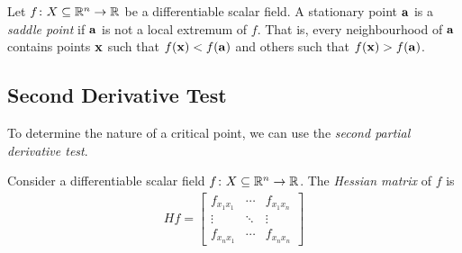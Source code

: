 \documentclass{article}
\begin{document}
\begin{definition}
  Let $f \colon X \subseteq \mathbb{R}^n \to \mathbb{R}$ be a differentiable scalar field.
  A stationary point $\mathbf{a}$ is a \emph{saddle point} if $\mathbf{a}$ is not a local extremum of $f$.
  That is, every neighbourhood of $\mathbf{a}$ contains points $\mathbf{x}$ such that $f(\mathbf{x}) < f(\mathbf{a})$ and others such that $f(\mathbf{x}) > f(\mathbf{a})$.
\end{definition}

\subsection{Second Derivative Test}

To determine the nature of a critical point, we can use the \emph{second partial derivative test}.

\begin{definition}
  Consider a differentiable scalar field $f \colon X \subseteq \mathbb{R}^n \to \mathbb{R}$.
  The \emph{Hessian matrix} of $f$ is
  \begin{align}
    Hf = \begin{bmatrix}
           f_{x_1 x_1} & \cdots & f_{x_1 x_n}
           \\
           \vdots      & \ddots & \vdots
           \\
           f_{x_n x_1} & \cdots & f_{x_n x_n}
         \end{bmatrix}
  \end{align}
\end{definition}
\end{document}
